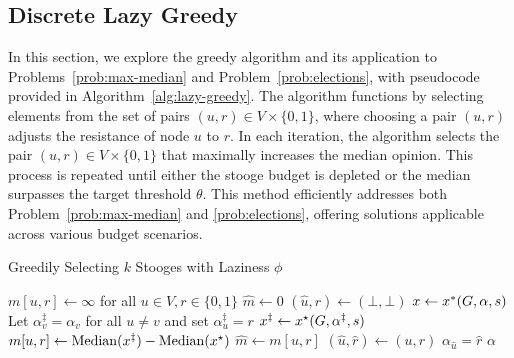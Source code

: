 \subsection{Discrete Lazy Greedy}
\label{sec:lazy-greedy}

In this section, we explore the greedy algorithm and its application to Problems~\ref{prob:max-median} and Problem~\ref{prob:elections}, with pseudocode provided in Algorithm~\ref{alg:lazy-greedy}. The algorithm functions by selecting elements from the set of pairs \((u, r) \in V \times \{0, 1\}\), where choosing a pair \((u, r)\) adjusts the resistance of node \(u\) to \(r\). In each iteration, the algorithm selects the pair \((u, r) \in V \times \{0, 1\}\) that maximally increases the median opinion. This process is repeated until either the stooge budget is depleted or the median surpasses the target threshold \(\theta\). This method efficiently addresses both Problem~\ref{prob:max-median} and \ref{prob:elections}, offering solutions applicable across various budget scenarios.

\begin{algorithm}
\caption{Greedily Selecting $k$ Stooges with Laziness $\phi$}
\label{alg:lazy-greedy}
\begin{algorithmic}[1]
    \State $m[u, r] \gets \infty$
        for all $u\in V, r\in \{0,1\}$
        \State $\hat m \gets 0$
        \State $(\hat u, \hat r) \gets (\bot, \bot)$
        \State $x \gets x^*(G, \alpha, s)$
            \EndIf
            \State Let $\alpha_v^\ddagger = \alpha_v$ for all $u\not=v$ and
            set $\alpha_u^\ddagger = r$
            \State $x^{\ddagger} \gets x^\star(G, \alpha^{\ddagger}, s)$
            \State $m[u, r] \gets \mathrm{Median}(x^{\ddagger}) - \mathrm{Median}(x^\star)$
            \State {}
                \State $\hat m \gets m[u, r]$
                \State $(\hat u, \hat r) \gets (u, r)$
            \EndIf
        \EndFor
            \State $\alpha_{\hat u} = \hat r$
        \EndIf
    \EndFor
    \State \Return $\alpha$
\EndFunction
\end{algorithmic}
\end{algorithm}



